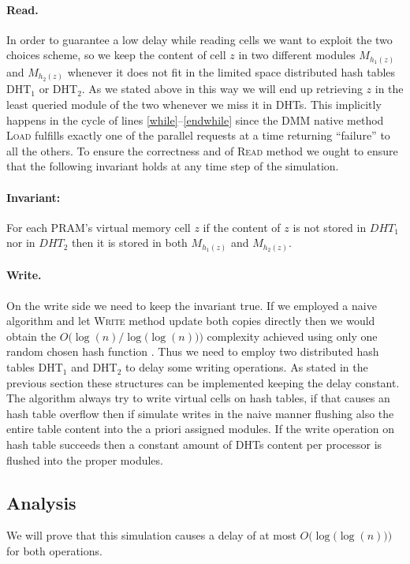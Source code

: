 \paragraph{{\bf Read}.} In order to guarantee
a low delay while reading cells we want to exploit the two choices scheme,
so we keep the content of cell $z$ in two different modules $M_{h_1(z)}$ and
$M_{h_2(z)}$ whenever it does not fit in the limited space distributed hash tables DHT$_1$ or DHT$_2$. As we stated above in this way we will end up
retrieving $z$ in the least queried
module of the two whenever we miss it in DHTs. This implicitly happens in the cycle of lines
\ref{while}--\ref{endwhile} since
the DMM native method \textsc{Load} fulfills exactly one of the parallel requests at
a time returning ``failure'' to all the others. To ensure the correctness and
of \textsc{Read} method we ought to ensure that the following invariant holds
at any time step of the simulation.
\paragraph{Invariant:} For each PRAM's virtual memory cell $z$ if the content of
$z$ is not stored in $DHT_1$ nor in $DHT_2$ then it is stored in both
$M_{h_1(z)}$ and $M_{h_2(z)}$.

\paragraph{{\bf Write}.}On the write side we need to keep the invariant true.
If we employed a naive algorithm and let \textsc{Write}
method update
both copies directly then we would obtain the $O\bigl(\log(n)\bigr / \log\bigl(\log(n)\bigr)\big)$ complexity achieved using only
one random chosen hash function \cite{art}. Thus we need to employ two
distributed hash tables DHT$_1$ and DHT$_2$ to delay some writing operations.
As stated in the previous section these structures can be implemented keeping
the delay constant.
The algorithm always try to write virtual cells on hash tables, if that causes
an hash table overflow then if simulate writes in the naive manner flushing also
the entire table content into the a priori assigned modules.
If the write operation on hash table succeeds then a constant amount of
DHTs content per processor is flushed into the proper modules.

\subsection{Analysis}
We will prove that this simulation causes a delay of at most $O\bigl(\log\bigl(\log(n)\bigl)\bigl)$ for both operations.

